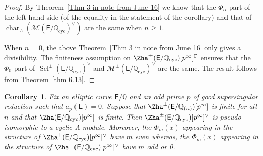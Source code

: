 \documentclass{amsart}
\newtheorem{corollary}[theorem]{Corollary}
\numberwithin{equation}{section}
\theoremstyle{remark}
\newcommand{\EC}{\mathsf{E}}
\newcommand{\cM}{\mathcal{M}}
\newcommand{\Q}{\mathbb{Q}}
\newcommand{\cyc}{\operatorname{{cyc}}}
\newcommand{\Sel}{\operatorname{Sel}}
\newcommand{\charac}{\operatorname{char}}
\theoremstyle{plain} %
\begin{document}
\begin{proof}
By Theorem~\ref{Thm 3 in note from June 16} we know that the $\Phi_n$-part of the left hand side (of the equality in the statement of the corollary) and that of $\charac_{\Lambda}(\cM(\EC/\Q_{\cyc})^\vee)$ are the same when $n\geq 1$.

When $n=0$, the above Theorem~\ref{Thm 3 in note from June 16} only gives a divisibility.
The finiteness assumption on $\Zha^{\pm}(\EC/\Q_{\cyc})[p^\infty]^{\Gamma}$ ensures that the $\Phi_0$-part of $\Sel^{\pm}(\EC/\Q_{\cyc})^\vee$ and $\cM^{\pm}(\EC/\Q_{\cyc})^\vee$ are the same.
The result follows from Theorem~\ref{thm 6.13}.
\end{proof}


\begin{corollary}
Fix an elliptic curve $\EC/\Q$ and an odd prime $p$ of good \emph{supersingular} reduction such that $a_p(\EC)=0$.
Suppose that $\Zha^{\pm}(\EC/\Q_{(n)})[p^{\infty}]$ is finite for all $n$ and that $\Zha(\EC/\Q_{\cyc})[p^\infty]$ is finite.
Then $\Zha^{\pm}(\EC/\Q_{\cyc})[p^\infty]^\vee$ is pseudo-isomorphic to a cyclic $\Lambda$-module.
 Moreover, the $\Phi_m(x)$ appearing in the structure of $\Zha^{+}(\EC/\Q_{\cyc})[p^\infty]^\vee$ have $m$ even whereas, the $\Phi_m(x)$ appearing in the structure of $\Zha^{-}(\EC/\Q_{\cyc})[p^\infty]^\vee$ have $m$ odd or 0.
\end{corollary}




\end{document}
